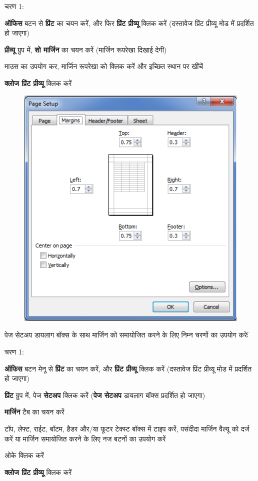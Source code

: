 \begin{descriptionSimple}{चरण 1:}
\item[चरण 1] \textbf{ऑफिस} बटन से \textbf{प्रिंट} का चयन करें, और फिर \textbf{प्रिंट प्रीव्यू} क्लिक करें (दस्तावेज प्रिंट प्रीव्यू मोड में प्रदर्शित हो जाएगा)
\item[चरण 2] \textbf{प्रीव्यू} ग्रुप में, \textbf{शो मार्जिन} का चयन करें (मार्जिन रूपरेखा दिखाई देगी)
\item[चरण 3] माउस का उपयोग कर, मार्जिन रूपरेखा को क्लिक करें और इच्छित स्थान पर खींचें
\item[चरण 4] \textbf{क्लोज प्रिंट प्रीव्यू} क्लिक करें
\end{descriptionSimple}				
\begin{figure}[tbp]
\centering
\includegraphics[scale=0.4]{src/images/chapter1/chapter1_fig47.png}
\end{figure}

पेज सेटअप डायलाग बॉक्स के साथ मार्जिन को समायोजित करने के लिए निम्न चरणों का उपयोग करेःं

\begin{descriptionSimple}{चरण 1:}
\item[चरण 1] \textbf{ऑफिस} बटन मेनू से \textbf{प्रिंट} का चयन करें, और \textbf{प्रिंट प्रीव्यू} क्लिक करें (दस्तावेज प्रिंट प्रीव्यू मोड में प्रदर्शित हो जाएगा)
\item[चरण 2] \textbf{प्रिंट} ग्रुप में, पेज \textbf{सेटअप} क्लिक करें (\textbf{पेज सेटअप} डायलाग बॉक्स प्रदर्शित हो जाएगा)
\item[चरण 3] \textbf{मार्जिन} टैब का चयन करें
\item[चरण 4] टॉप, लेफ्ट, राईट, बॉटम, हैडर और/या फूटर टेक्स्ट बॉक्स में टाइप करें, पसंदीदा मार्जिन वैल्यू को दर्ज करें या मार्जिन समायोजित करने के लिए नज बटनों का उपयोग करें
\item[चरण 5] ओके क्लिक करें
\item[चरण 6] \textbf{क्लोज प्रिंट प्रीव्यू} क्लिक करें
\end{descriptionSimple}

